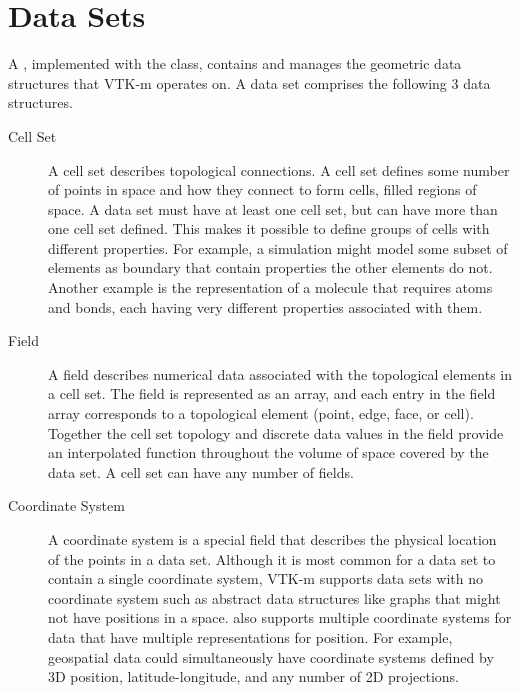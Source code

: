 
\chapter{Data Sets}
\label{chap:DataSets}
\label{chap:DataSet}


A , implemented with the  class,
contains and manages the geometric data structures that VTK-m operates on.
A data set comprises the following 3 data structures.

\begin{description}
\item[Cell Set]  A cell set describes topological
  connections. A cell set defines some number of points in space and how
  they connect to form cells, filled regions of space. A data set must have
  at least one cell set, but can have more than one cell set defined. This
  makes it possible to define groups of cells with different properties.
  For example, a simulation might model some subset of elements as boundary
  that contain properties the other elements do not. Another example is the
  representation of a molecule that requires atoms and bonds, each having
  very different properties associated with them.
\item[Field]  A field describes numerical data associated with
  the topological elements in a cell set. The field is represented as an
  array, and each entry in the field array corresponds to a topological
  element (point, edge, face, or cell). Together the cell set topology and
  discrete data values in the field provide an interpolated function
  throughout the volume of space covered by the data set. A cell set can
  have any number of fields.
\item[Coordinate System]  A coordinate system is a
  special field that describes the physical location of the points in a
  data set. Although it is most common for a data set to contain a single
  coordinate system, VTK-m supports data sets with no coordinate system
  such as abstract data structures like graphs that might not have
  positions in a space.  also supports multiple
  coordinate systems for data that have multiple representations for
  position. For example, geospatial data could simultaneously have
  coordinate systems defined by 3D position, latitude-longitude, and any
  number of 2D projections.
\end{description}

